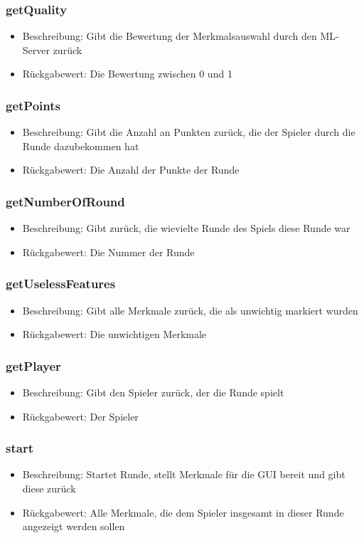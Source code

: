 \documentclass[a4paper]{scrreprt}
\begin{document}
	\subsubsection{getQuality}
	\begin{itemize}
		\item Beschreibung: Gibt die Bewertung der Merkmalsauswahl durch den ML-Server zurück
		\item Rückgabewert: Die Bewertung zwischen 0 und 1
	\end{itemize}
	\subsubsection{getPoints}
	\begin{itemize}
		\item Beschreibung: Gibt die Anzahl an Punkten zurück, die der Spieler durch die Runde dazubekommen hat
		\item Rückgabewert: Die Anzahl der Punkte der Runde
	\end{itemize}
	\subsubsection{getNumberOfRound}
	\begin{itemize}
		\item Beschreibung: Gibt zurück, die wievielte Runde des Spiels diese Runde war
		\item Rückgabewert: Die Nummer der Runde
	\end{itemize}
	\subsubsection{getUselessFeatures}
	\begin{itemize}
		\item Beschreibung: Gibt alle Merkmale zurück, die als unwichtig markiert wurden
		\item Rückgabewert: Die unwichtigen Merkmale
	\end{itemize}
	\subsubsection{getPlayer}
	\begin{itemize}
		\item Beschreibung: Gibt den Spieler zurück, der die Runde spielt
		\item Rückgabewert: Der Spieler
	\end{itemize}
	\subsubsection{start}
	\begin{itemize}
		\item Beschreibung: Startet Runde, stellt Merkmale für die GUI bereit und gibt diese zurück
		\item Rückgabewert: Alle Merkmale, die dem Spieler insgesamt in dieser Runde angezeigt werden sollen
	\end{itemize}
\end{document}
